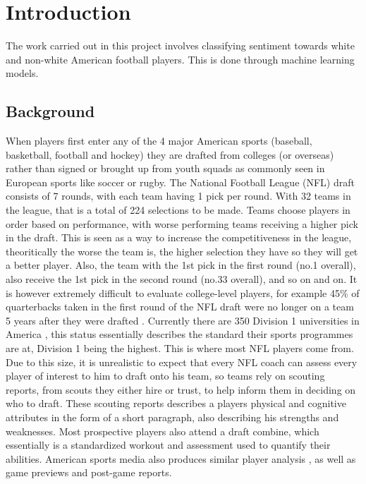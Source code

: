 \documentclass[oneside,12pt]{Classes/RoboticsLaTeX}
\begin{document}
\mainmatter

\chapter{Introduction}
\label{chap:introduction}
\setcounter{page}{7}
The work carried out in this project involves classifying sentiment towards white and non-white
American football players. This is done through machine learning models.

\section{Background}
When players first enter any of the 4 major American sports (baseball, basketball, football and hockey) they are
drafted from colleges (or overseas) rather than signed or brought up from youth squads as commonly seen in
European sports like soccer or rugby. The National Football League (NFL) draft consists of 7 rounds, with each team
having 1 pick per round. With 32 teams in the league, that is a total of 224 selections to be made. Teams choose players in order based on performance, with worse performing teams 
receiving a higher pick in the draft. This is seen as a way to increase the competitiveness in the league, theoritically the worse the 
team is, the higher selection they have so they will get a better player. Also, the team with the 1st pick in the first round (no.1 overall), also 
receive the 1st pick in the second round (no.33 overall), and so on and on. It is however extremely difficult to evaluate college-level players,
for example 45\% of quarterbacks taken in the first round of the NFL draft were no longer on a team 5 years after they were drafted \citep{qbSuccess}.
Currently there are 350 Division 1 universities in America \citep{NCAA}, this status
essentially describes the standard their sports programmes are at, Division 1 being the highest. This is where most
NFL players come from. Due to this size, it is unrealistic to expect that every NFL coach can assess every player of
interest to him to draft onto his team, so teams rely on scouting reports, from scouts they either hire or trust, to
help inform them in deciding on who to draft. These scouting reports describes a players physical and cognitive
attributes in the form of a short paragraph, also describing his strengths and weaknesses. Most prospective players also attend a draft combine, which essentially
is a standardized workout and assessment used to quantify their abilities. American sports media also produces
similar player analysis \citep{KellyRinger}, as well as game previews and post-game reports.
\end{document}
